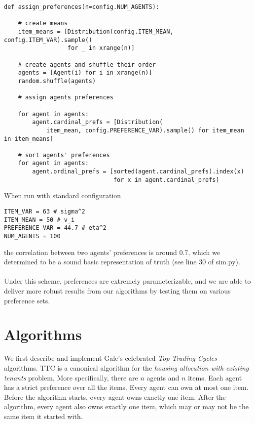 \documentclass[12pt]{article}
\begin{document}
\begin{verbatim}
def assign_preferences(n=config.NUM_AGENTS):
 
    # create means
    item_means = [Distribution(config.ITEM_MEAN, config.ITEM_VAR).sample()
                  for _ in xrange(n)]
 
    # create agents and shuffle their order
    agents = [Agent(i) for i in xrange(n)]
    random.shuffle(agents)
 
    # assign agents preferences
 
    for agent in agents:
        agent.cardinal_prefs = [Distribution(
            item_mean, config.PREFERENCE_VAR).sample() for item_mean in item_means]
 
    # sort agents' preferences
    for agent in agents:
        agent.ordinal_prefs = [sorted(agent.cardinal_prefs).index(x)
                               for x in agent.cardinal_prefs]
\end{verbatim}
 
\noindent When run with standard configuration
\begin{verbatim}
ITEM_VAR = 63 # sigma^2
ITEM_MEAN = 50 # v_i
PREFERENCE_VAR = 44.7 # eta^2
NUM_AGENTS = 100
\end{verbatim}
\noindent the correlation between two agents' preferences is around 0.7, which we determined to be a sound basic representation of truth (see line 30 of sim.py).
\\\\Under this scheme, preferences are extremely parameterizable, and we are able to deliver more robust results from our algorithms by testing them on various preference sets.
 
\section*{Algorithms}
 
We first describe and implement Gale's celebrated \textit{Top Trading Cycles} algorithms. TTC is a canonical algorithm for the \textit{housing allocation with existing tenants} problem. More specifically, there are $n$ agents and $n$ items. Each agent has a strict preference over all the items. Every agent can own at most one item. Before the algorithm starts, every agent owns exactly one item. After the algorithm, every agent also owns exactly one item, which may or may not be the same item it started with. 
 
\end{document}
